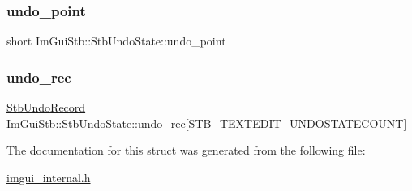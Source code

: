 \mbox{\label{struct_im_gui_stb_1_1_stb_undo_state_a594ee4720e8280db9595f2d5419a279c}} 
\subsubsection{\texorpdfstring{undo\+\_\+point}{undo\_point}}
{\footnotesize\ttfamily short Im\+Gui\+Stb\+::\+Stb\+Undo\+State\+::undo\+\_\+point}

\mbox{\label{struct_im_gui_stb_1_1_stb_undo_state_a3cba4c0766038584aa310a52e763bbda}} 
\subsubsection{\texorpdfstring{undo\+\_\+rec}{undo\_rec}}
{\footnotesize\ttfamily \mbox{\hyperlink{struct_im_gui_stb_1_1_stb_undo_record}{Stb\+Undo\+Record}} Im\+Gui\+Stb\+::\+Stb\+Undo\+State\+::undo\+\_\+rec\mbox{[}\mbox{\hyperlink{imstb__textedit_8h_afa79483143df87a1497010712b3dfaf9}{S\+T\+B\+\_\+\+T\+E\+X\+T\+E\+D\+I\+T\+\_\+\+U\+N\+D\+O\+S\+T\+A\+T\+E\+C\+O\+U\+NT}}\mbox{]}}



The documentation for this struct was generated from the following file\+:\begin{DoxyCompactItemize}
\item 
\mbox{\hyperlink{imgui__internal_8h}{imgui\+\_\+internal.\+h}}\end{DoxyCompactItemize}
